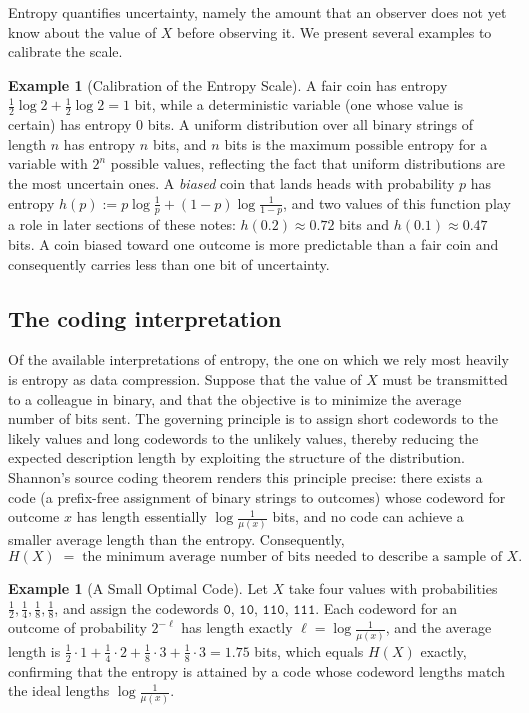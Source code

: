 \documentclass[10pt]{article}
\theoremstyle{definition}
\newtheorem{example}[theorem]{Example}
\theoremstyle{remark}
\begin{document}
Entropy quantifies uncertainty, namely the amount that an observer does not yet know about the value of $X$ before observing it. We present several examples to calibrate the scale.

\begin{example}[Calibration of the Entropy Scale]
\label{ex:entropy-calibration}
A fair coin has entropy $\frac12 \log 2 + \frac12 \log 2 = 1$ bit, while a deterministic variable (one whose value is certain) has entropy $0$ bits. A uniform distribution over all binary strings of length $n$ has entropy $n$ bits, and $n$ bits is the maximum possible entropy for a variable with $2^n$ possible values, reflecting the fact that uniform distributions are the most uncertain ones. A \emph{biased} coin that lands heads with probability $p$ has entropy $h(p) := p \log \frac1p + (1-p)\log\frac{1}{1-p}$, and two values of this function play a role in later sections of these notes: $h(0.2) \approx 0.72$ bits and $h(0.1) \approx 0.47$ bits. A coin biased toward one outcome is more predictable than a fair coin and consequently carries less than one bit of uncertainty.
\end{example}

\subsection{The coding interpretation}
\label{sec:coding}

Of the available interpretations of entropy, the one on which we rely most heavily is entropy as data compression. Suppose that the value of $X$ must be transmitted to a colleague in binary, and that the objective is to minimize the average number of bits sent. The governing principle is to assign short codewords to the likely values and long codewords to the unlikely values, thereby reducing the expected description length by exploiting the structure of the distribution. Shannon's source coding theorem renders this principle precise: there exists a code (a prefix-free assignment of binary strings to outcomes) whose codeword for outcome $x$ has length essentially $\log \frac{1}{\mu(x)}$ bits, and no code can achieve a smaller average length than the entropy. Consequently,
\[
H(X) \;=\; \text{the minimum average number of bits needed to describe a sample of } X .
\]

\begin{example}[A Small Optimal Code]
Let $X$ take four values with probabilities $\frac12, \frac14, \frac18, \frac18$, and assign the codewords $\mathtt{0}$, $\mathtt{10}$, $\mathtt{110}$, $\mathtt{111}$. Each codeword for an outcome of probability $2^{-\ell}$ has length exactly $\ell = \log \frac{1}{\mu(x)}$, and the average length is $\frac12 \cdot 1 + \frac14 \cdot 2 + \frac18 \cdot 3 + \frac18 \cdot 3 = 1.75$ bits, which equals $H(X)$ exactly, confirming that the entropy is attained by a code whose codeword lengths match the ideal lengths $\log \frac{1}{\mu(x)}$.
\end{example}
\end{document}
